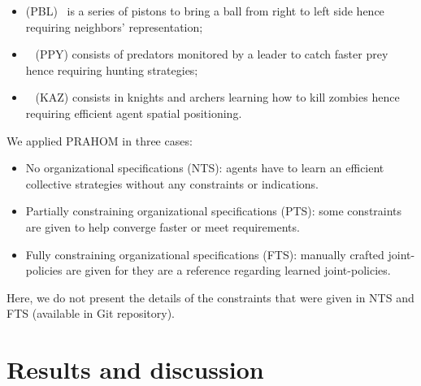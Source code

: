 \documentclass{ecai}
\begin{document}
\begin{itemize}
    \item {} (PBL)~\cite{Terry2021} is a series of pistons to bring a ball from right to left side hence requiring neighbors' representation;
    \item {}~\cite{Lowe2017} (PPY) consists of predators monitored by a leader to catch faster prey hence requiring hunting strategies;
    \item {}~\cite{Terry2021} (KAZ) consists in knights and archers learning how to kill zombies hence requiring efficient agent spatial positioning.
\end{itemize}
%
\noindent We applied PRAHOM in three cases:
\begin{itemize}
    \item No organizational specifications (NTS): agents have to learn an efficient collective strategies without any constraints or indications.
    \item Partially constraining organizational specifications (PTS): some constraints are given to help converge faster or meet requirements.
    \item Fully constraining organizational specifications (FTS): manually crafted joint-policies are given for they are a reference regarding learned joint-policies.
\end{itemize}

\noindent Here, we do not present the details of the constraints that were given in NTS and FTS (available in Git repository\footnotemark[1]).


\section{Results and discussion}



\end{document}
